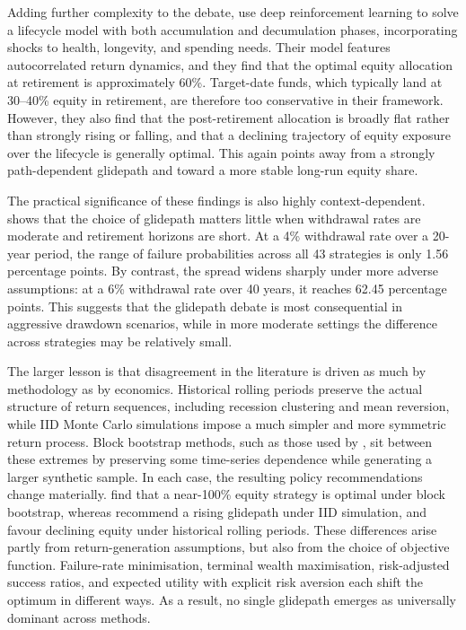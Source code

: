 \documentclass[11pt]{article}
\begin{document}
Adding further complexity to the debate, \textcite{parker2024simple} use deep reinforcement learning to solve a lifecycle model with both accumulation and decumulation phases, incorporating shocks to health, longevity, and spending needs. Their model features autocorrelated return dynamics, and they find that the optimal equity allocation at retirement is approximately 60\%. Target-date funds, which typically land at 30--40\% equity in retirement, are therefore too conservative in their framework. However, they also find that the post-retirement allocation is broadly flat rather than strongly rising or falling, and that a declining trajectory of equity exposure over the lifecycle is generally optimal. This again points away from a strongly path-dependent glidepath and toward a more stable long-run equity share.

The practical significance of these findings is also highly context-dependent. \textcite{blanchett2007dynamic} shows that the choice of glidepath matters little when withdrawal rates are moderate and retirement horizons are short. At a 4\% withdrawal rate over a 20-year period, the range of failure probabilities across all 43 strategies is only 1.56 percentage points. By contrast, the spread widens sharply under more adverse assumptions: at a 6\% withdrawal rate over 40 years, it reaches 62.45 percentage points. This suggests that the glidepath debate is most consequential in aggressive drawdown scenarios, while in more moderate settings the difference across strategies may be relatively small.

The larger lesson is that disagreement in the literature is driven as much by methodology as by economics. Historical rolling periods preserve the actual structure of return sequences, including recession clustering and mean reversion, while IID Monte Carlo simulations impose a much simpler and more symmetric return process. Block bootstrap methods, such as those used by \textcite{anarkulova2025beyond}, sit between these extremes by preserving some time-series dependence while generating a larger synthetic sample. In each case, the resulting policy recommendations change materially. \textcite{anarkulova2025beyond} find that a near-100\% equity strategy is optimal under block bootstrap, whereas \textcite{pfau2014rising} recommend a rising glidepath under IID simulation, and \textcite{estrada2015retirement} favour declining equity under historical rolling periods. These differences arise partly from return-generation assumptions, but also from the choice of objective function. Failure-rate minimisation, terminal wealth maximisation, risk-adjusted success ratios, and expected utility with explicit risk aversion each shift the optimum in different ways. As a result, no single glidepath emerges as universally dominant across methods.
\end{document}
